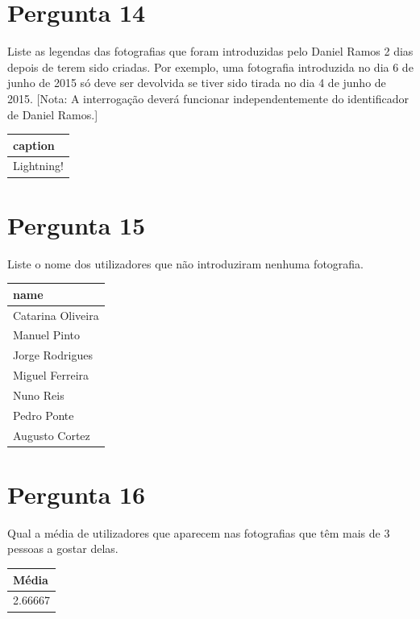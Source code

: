 {\section{Pergunta 14}
Liste as legendas das fotografias que foram introduzidas pelo Daniel Ramos 2 dias depois de terem sido criadas. Por exemplo, uma fotografia introduzida no dia 6 de junho de 2015 só deve ser devolvida se tiver sido tirada no dia 4 de junho de 2015. [Nota: A interrogação deverá funcionar independentemente do identificador de Daniel Ramos.]
\begin{center} \begin{tabular}{l}
    \textbf{caption} \\ \hline
    Lightning!
\end{tabular} \end{center}


\section{Pergunta 15}
Liste o nome dos utilizadores que não introduziram nenhuma fotografia.
\begin{center} \begin{tabular}{l}
    \textbf{name}     \\ \hline
    Catarina Oliveira \\
    Manuel Pinto      \\
    Jorge Rodrigues   \\
    Miguel Ferreira   \\
    Nuno Reis         \\
    Pedro Ponte       \\
    Augusto Cortez
\end{tabular} \end{center}


\section{Pergunta 16}
Qual a média de utilizadores que aparecem nas fotografias que têm mais de 3 pessoas a gostar delas.
\begin{center} \begin{tabular}{l}
    \textbf{Média}     \\ \hline
    2.66667
\end{tabular} \end{center}


}
